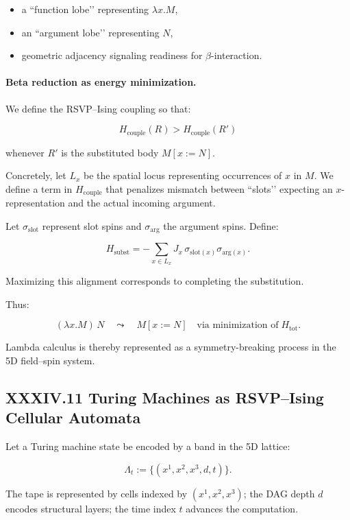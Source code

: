 \documentclass[11pt,letterpaper]{article}
\begin{document}
\begin{itemize}
    \item a ``function lobe’’ representing $\lambda x.M$,
    \item an ``argument lobe’’ representing $N$,
    \item geometric adjacency signaling readiness for $\beta$-interaction.
\end{itemize}

\paragraph{Beta reduction as energy minimization.}
We define the RSVP–Ising coupling so that:

\[
H_{\text{couple}}(R) > H_{\text{couple}}(R')
\]

whenever $R'$ is the substituted body $M[x:=N]$.

Concretely, let $L_x$ be the spatial locus representing occurrences of $x$ in $M$. We define a term in $H_{\text{couple}}$ that penalizes mismatch between ``slots’’ expecting an $x$-representation and the actual incoming argument.

Let $\sigma_{\text{slot}}$ represent slot spins and $\sigma_{\text{arg}}$ the argument spins. Define:

\[
H_{\text{subst}} = -\sum_{x\in L_x} J_x\, \sigma_{\text{slot}(x)} \sigma_{\text{arg}(x)}.
\]

Maximizing this alignment corresponds to completing the substitution.

Thus:

\[
(\lambda x. M)\,N 
\quad\leadsto\quad
M[x:=N]
\quad\text{via minimization of}\; H_{\text{tot}}.
\]

Lambda calculus is thereby represented as a symmetry-breaking process in the 5D field–spin system.

\subsection{XXXIV.11 Turing Machines as RSVP–Ising Cellular Automata}

Let a Turing machine state be encoded by a band in the 5D lattice:

\[
\Lambda_{t} := \{(x^1,x^2,x^3,d,t)\}.
\]

The tape is represented by cells indexed by $(x^1,x^2,x^3)$; the DAG depth $d$ encodes structural layers; the time index $t$ advances the computation.
\end{document}
